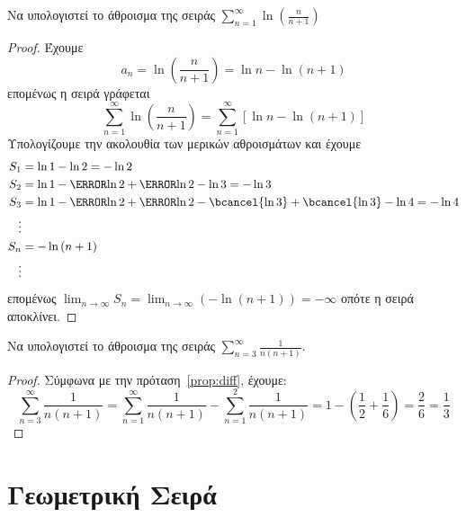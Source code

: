 \documentclass[a4paper,table]{report}
\begin{document}
\begin{examples}
\begin{enumerate}
        \item Να υπολογιστεί το άθροισμα της σειράς $ \sum_{n=1}^{\infty} 
            \ln{\left(\frac{n}{n+1}\right)} $
            \begin{proof}
            \item {}
                Έχουμε
                \[
                    a_{n} = \ln{\left(\frac{n}{n+1}\right)} = \ln{n} - \ln{(n+1)}  
                \]
                επομένως η σειρά γράφεται
                \[
                    \sum_{n=1}^{\infty} \ln{\left(\frac{n}{n+1} \right)} = 
                    \sum_{n=1}^{\infty} [ \ln{n} - \ln{(n+1)} ]
                \] 
                Υπολογίζουμε την ακολουθία των μερικών αθροισμάτων και έχουμε
                \begin{align*}
                  S_{1} &= \ln{1} - \ln{2} = - \ln{2}  \\
                  S_{2} &= \ln{1} - \cancel{\ln{2}} + \cancel{\ln{2}} - \ln{3} 
                  = - \ln{3}  \\
                  S_{3} &= \ln{1} - \cancel{\ln{2}} + \cancel{\ln{2}} -
                  \bcancel{\ln{3}} + \bcancel{\ln{3}} - \ln{4} = - \ln{4} \\
                  \vdots \\
                  S_{n} &= - \ln{(n+1)} \\
                  \vdots
                \end{align*}
                επομένως $ \lim_{n \to \infty} S_{n} = 
                \lim_{n \to \infty} (- \ln{(n+1)}) = - \infty $ οπότε η σειρά αποκλίνει.
            \end{proof}
    \end{enumerate}
\end{examples}


\begin{example}
    Να υπολογιστεί το άθροισμα της σειράς $ \sum_{n=3}^{\infty} \frac{1}{n(n+1)} $.
\end{example}
\begin{proof}
  Σύμφωνα με την πρόταση~\ref{prop:diff}, έχουμε:
    \[
        \sum_{n=3}^{\infty} \frac{1}{n(n+1)} = \sum_{n=1}^{\infty} 
        \frac{1}{n(n+1)} - \sum_{n=1}^{2} \frac{1}{n(n+1)} = 1 - \left(\frac{1}{2} + 
        \frac{1}{6}\right) = \frac{2}{6} = \frac{1}{3}
    \] 
\end{proof}


\section{Γεωμετρική Σειρά}
\end{document}
